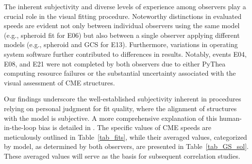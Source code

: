 The inherent subjectivity and diverse levels of experience among observers play a crucial role in the visual fitting procedure. Noteworthy distinctions in evaluated speeds are evident not only between individual observers using the same model (e.g., spheroid fit for E06) but also between a single observer applying different models (e.g., spheroid and GCS for E13). Furthermore, variations in operating system software further contributed to differences in results. Notably, events E04, E08, and E21 were not completed by both observers due to either PyThea computing resource failures or the substantial uncertainty associated with the visual assessment of CME structures.

Our findings underscore the well-established subjectivity inherent in procedures relying on personal judgment for fit quality, where the alignment of structures with the model is subjective. A more comprehensive explanation of this human-in-the-loop bias is detailed in \citep{verbeke_2022}. The specific values of CME speeds are meticulously outlined in Table~\ref{tab_fits}, while their averaged values, categorized by model, as determined by both observers, are presented in Table~\ref{tab_GS_sol}. These averaged values will serve as the basis for subsequent correlation studies.

